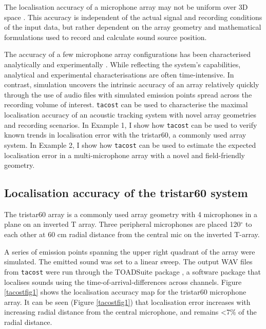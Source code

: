 \documentclass[
]{book}
\begin{document}
The localisation accuracy of a microphone array may not be uniform over 3D space \citep{aubauer1996acoustical, Wahlberg1999}. This accuracy is independent of the actual signal and recording conditions of the input data, but rather dependent on the array geometry and mathematical formulations used to record and calculate sound source position.

The accuracy of a few microphone array configurations has been characterised analytically \citep{aubauer1996acoustical} and experimentally \citep{Wahlberg1999}. While reflecting the system's capabilities, analytical
and experimental characterisations are often time-intensive. In contrast, simulation uncovers the intrinsic accuracy of an array relatively quickly through the use of audio files with simulated emission points spread across the recording volume of interest.
\texttt{tacost} can be used to characterise the maximal localisation accuracy of an acoustic tracking system with novel array geometries and recording scenarios. In Example 1, I show how \texttt{tacost} can be used to verify known trends in
localisation error with the tristar60, a commonly used array system. In Example 2, I show how \texttt{tacost} can be used to estimate the expected localisation error in a multi-microphone array with a novel and field-friendly geometry.

\hypertarget{localisation-accuracy-of-the-tristar60-system}{%
\subsection{Localisation accuracy of the tristar60 system}\label{localisation-accuracy-of-the-tristar60-system}}

The tristar60 array is a commonly used array geometry \citep{aubauer1996acoustical, Holderied20032293, Hugel2017, Lewanzik2018} with 4 microphones in a plane on an inverted T array. Three peripheral microphones are placed 120\(^{\circ}\) to each other at 60 cm radial distance from the central mic on the inverted T-array.

A series of emission points spanning the upper right quadrant of the array were simulated. The emitted sound was set to a linear sweep. The output WAV files from \texttt{tacost} were run through the TOADSuite package \citep{holger_toadsuite_manual, toadsuite_peterstilz}, a software package that localises sounds using the time-of-arrival-differences across channels. Figure \ref{tacostfig1} shows the localisation accuracy map
for the tristar60 microphone array. It can be seen (Figure \ref{tacostfig1}) that localisation error increases with increasing radial distance from the central microphone, and remains \textless7\(\%\) of the radial distance.
\end{document}
